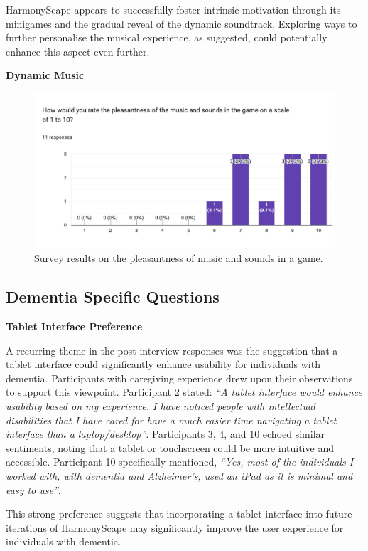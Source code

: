 \documentclass{l4proj}
\begin{document}
HarmonyScape appears to successfully foster intrinsic motivation through its minigames and the gradual reveal of the dynamic soundtrack. Exploring ways to further personalise the musical experience, as suggested, could potentially enhance this aspect even further.

\textbf{Dynamic Music}
\begin{figure}[h]
 \centering
 \includegraphics[width=0.7\linewidth]{dissertation/images/Pleasentness.png} 
 \caption{Survey results on the pleasantness of music and sounds in a game.} 
 \label{fig:pleasentness} 
\end{figure}


\subsection{Dementia Specific Questions}

\textbf{Tablet Interface Preference}

A recurring theme in the post-interview responses was the suggestion that a tablet interface could significantly enhance usability for individuals with dementia. Participants with caregiving experience drew upon their observations to support this viewpoint. Participant 2 stated: \emph{“A tablet interface would enhance usability based on my experience. I have noticed people with intellectual disabilities that I have cared for have a much easier time navigating a tablet interface than a laptop/desktop”}. Participants 3, 4, and 10 echoed similar sentiments, noting that a tablet or touchscreen could be more intuitive and accessible. Participant 10 specifically mentioned, \emph{“Yes, most of the individuals I worked with, with dementia and Alzheimer's, used an iPad as it is minimal and easy to use”}. 

This strong preference suggests that incorporating a tablet interface into future iterations of HarmonyScape may significantly improve the user experience for individuals with dementia.
\newline
\end{document}
